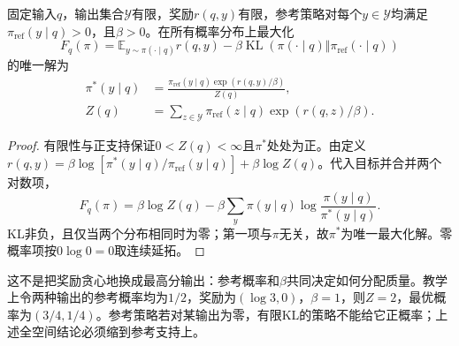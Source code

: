 \begin{theorem}[KL正则化奖励最大化的最优策略]
  \label{thm:rl-reward-kl}
  固定输入$q$，输出集合$\mathcal Y$有限，奖励$r(q,y)$有限，参考策略对每个$y\in\mathcal Y$均满足$\pi_{\mathrm{ref}}(y\mid q)>0$，且$\beta>0$。在所有概率分布上最大化
  \[
    F_q(\pi)=\mathbb E_{y\sim\pi(\cdot\mid q)}r(q,y)
     -\beta\operatorname{KL}(\pi(\cdot\mid q)\Vert
                                      \pi_{\mathrm{ref}}(\cdot\mid q))
  \]
  的唯一解为
  \begin{equation}
    \begin{aligned}
      \pi^*(y\mid q)&=
        \frac{\pi_{\mathrm{ref}}(y\mid q)\exp(r(q,y)/\beta)}{Z(q)},\\
      Z(q)&=\sum_{z\in\mathcal Y}\pi_{\mathrm{ref}}(z\mid q)
                                \exp(r(q,z)/\beta).
    \end{aligned}
    \label{eq:rl-reward-kl-optimum}
  \end{equation}
\end{theorem}

\begin{proof}
  有限性与正支持保证$0<Z(q)<\infty$且$\pi^*$处处为正。由定义
  $r(q,y)=\beta\log[\pi^*(y\mid q)/\pi_{\mathrm{ref}}(y\mid q)]
  +\beta\log Z(q)$。代入目标并合并两个对数项，
  \[
    F_q(\pi)=\beta\log Z(q)
       -\beta\sum_y\pi(y\mid q)\log\frac{\pi(y\mid q)}{\pi^*(y\mid q)}.
  \]
  KL非负，且仅当两个分布相同时为零；第一项与$\pi$无关，故$\pi^*$为唯一最大化解。零概率项按$0\log0=0$取连续延拓。
\end{proof}

这不是把奖励贪心地换成最高分输出：参考概率和$\beta$共同决定如何分配质量。教学上令两种输出的参考概率均为$1/2$，奖励为$(\log3,0)$，$\beta=1$，则$Z=2$，最优概率为$(3/4,1/4)$。参考策略若对某输出为零，有限KL的策略不能给它正概率；上述全空间结论必须缩到参考支持上。

